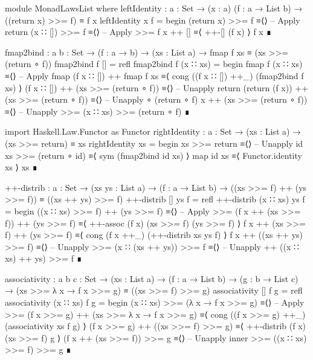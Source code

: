 \documentclass{article}
\begin{document}
\begin{code}
module MonadLawsList where
  leftIdentity : {a : Set} → (x : a) (f : a → List b)
    → ((return x) >>= f) ≡ f x
  leftIdentity x f =
    begin
      (return x) >>= f
    ≡⟨⟩ -- Apply return
      (x ∷ []) >>= f
    ≡⟨⟩ -- Apply >>=
      f x ++ []
    ≡⟨ ++-[] (f x) ⟩
      f x
    ∎
\end{code}
\begin{code}
  fmap2bind : {a b : Set} → (f : a → b) → (xs : List a)
    → fmap f xs ≡ (xs >>= (return ∘ f))
  fmap2bind f [] = refl
  fmap2bind f (x ∷ xs) =
    begin
      fmap f (x ∷ xs)
    ≡⟨⟩ -- Apply fmap
      (f x ∷ []) ++ fmap f xs
    ≡⟨ cong ((f x ∷ []) ++_) (fmap2bind f xs) ⟩
      (f x ∷ []) ++ (xs >>= (return ∘ f))
    ≡⟨⟩ -- Unapply return
      (return (f x)) ++ (xs >>= (return ∘ f))
    ≡⟨⟩ -- Unapply ∘
      (return ∘ f) x ++ (xs >>= (return ∘ f))
    ≡⟨⟩ -- Unapply >>=
      (x ∷ xs) >>= (return ∘ f)
    ∎
\end{code}
\begin{code}
  import Haskell.Law.Functor as Functor
  rightIdentity : {a : Set} → (xs : List a) → (xs >>= return) ≡ xs
  rightIdentity xs =
    begin
      xs >>= return
    ≡⟨⟩ -- Unapply id
      xs >>= (return ∘ id)
    ≡⟨ sym (fmap2bind id xs) ⟩
      map id xs
    ≡⟨ Functor.identity xs ⟩
      xs
    ∎
\end{code}
\begin{code}
  ++-distrib : {a : Set} → (xs ys : List a) → (f : a → List b)
    → ((xs >>= f) ++ (ys >>= f)) ≡ ((xs ++ ys) >>= f)
  ++-distrib [] ys f = refl
  ++-distrib (x ∷ xs) ys f =
    begin
      ((x ∷ xs) >>= f) ++ (ys >>= f)
    ≡⟨⟩ -- Apply >>=
      (f x ++ (xs >>= f)) ++ (ys >>= f)
    ≡⟨ ++-assoc (f x) (xs >>= f) (ys >>= f) ⟩
      f x ++ (xs >>= f) ++ (ys >>= f)
    ≡⟨ cong (f x ++_) (++-distrib xs ys f) ⟩
      f x ++ ((xs ++ ys) >>= f)
    ≡⟨⟩ -- Unapply >>=
      (x ∷ (xs ++ ys)) >>= f
    ≡⟨⟩ -- Unapply ++
      ((x ∷ xs) ++ ys) >>= f
    ∎
\end{code}
\begin{code}
  associativity : {a b c : Set}
    → (xs : List a) → (f : a → List b) → (g : b → List c)
    → (xs >>= λ x → f x >>= g) ≡ ((xs >>= f) >>= g)
  associativity [] f g = refl
  associativity (x ∷ xs) f g =
    begin
      (x ∷ xs) >>= (λ x → f x >>= g)
    ≡⟨⟩ -- Apply >>=
      (f x >>= g) ++ (xs >>= λ x → f x >>= g)
    ≡⟨ cong ((f x >>= g) ++_) (associativity xs f g) ⟩
      (f x >>= g) ++ ((xs >>= f) >>= g)
    ≡⟨ ++-distrib (f x) (xs >>= f) g ⟩
      (f x ++ (xs >>= f)) >>= g
    ≡⟨⟩ -- Unapply inner >>=
      ((x ∷ xs) >>= f) >>= g
    ∎
\end{code}
\end{document}
